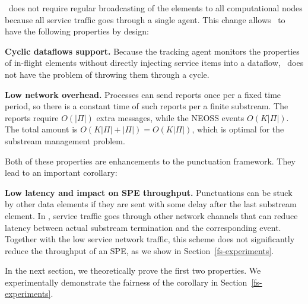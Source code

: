 \tracker\ does not require regular broadcasting of the elements to all computational nodes because all service traffic goes through a single agent. This change allows \tracker\ to have the following properties by design:

{\bf Cyclic dataflows support.} Because the tracking agent monitors the properties of in-flight elements without directly injecting service items into a dataflow, \tracker\ does not have the problem of throwing them through a cycle.

{\bf Low network overhead.} Processes can send reports once per a fixed time period, so there is a constant time of such reports per a finite substream. The reports require $O(|\Pi|)$ extra messages, while the NEOSS events $O(K|\Pi|)$. The total amount is $O(K|\Pi| + |\Pi|) = O(K|\Pi|)$, which is optimal for the substream management problem.

Both of these properties are enhancements to the punctuation framework. They lead to an important corollary: 

{\bf Low latency and impact on SPE throughput.} Punctuations can be stuck by other data elements if they are sent with some delay after the last substream element. In \tracker, service traffic goes through other network channels that can reduce latency between actual substream termination and the corresponding event. Together with the low service network traffic, this scheme does not significantly reduce the throughput of an SPE, as we show in Section~\ref{fs-experiments}.

In the next section, we theoretically prove the first two properties. We experimentally demonstrate the fairness of the corollary in Section~\ref{fs-experiments}.
